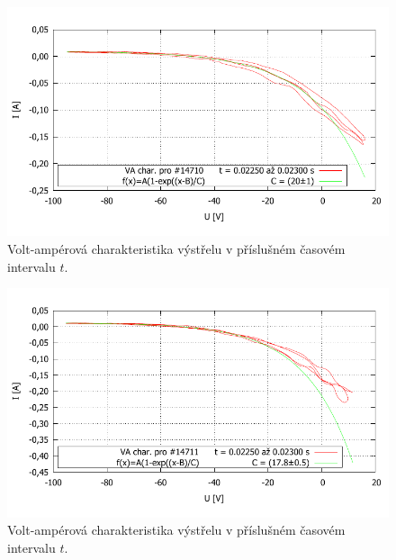 \documentclass[english]{article}
\begin{document}
	\begin{figure}[h!]
	\begin{center}
	    \vspace*{-1cm}
		\includegraphics[width=\linewidth]{../gnuplot/VA_merge_14710.pdf}
	    \vspace*{-1,5cm}
		\caption{Volt-ampérová charakteristika výstřelu v příslušném časovém intervalu $t$. } 
		\label{fig:g_VA5}
	\end{center}
	\end{figure}	
%
	\begin{figure}[h!]
	\begin{center}
	    \vspace*{-1cm}
		\includegraphics[width=\linewidth]{../gnuplot/VA_merge_14711.pdf}
	    \vspace*{-1,5cm}
		\caption{Volt-ampérová charakteristika výstřelu v příslušném časovém intervalu $t$. } 
		\label{fig:g_VA6}
	\end{center}
	\end{figure}	
%
\end{document}

